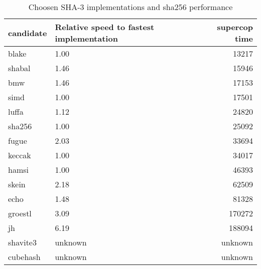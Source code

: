 \begin{table}
  \centering
  \begin{tabular}{ | l | l | r | }
    \hline
    \textbf{candidate} & \textbf{Relative speed to fastest implementation} & \textbf{supercop time} \\ \hline
     blake      & 1.00              & 13217         \\ \hline
     shabal     & 1.46              & 15946         \\ \hline
     bmw        & 1.46              & 17153         \\ \hline
     simd       & 1.00              & 17501         \\ \hline
     luffa      & 1.12              & 24820         \\ \hline
     sha256     & 1.00              & 25092         \\ \hline
     fugue      & 2.03              & 33694         \\ \hline
     keccak     & 1.00              & 34017         \\ \hline
     hamsi      & 1.00              & 46393         \\ \hline
     skein      & 2.18              & 62509         \\ \hline
     echo       & 1.48              & 81328         \\ \hline
     groestl    & 3.09              & 170272        \\ \hline
     jh         & 6.19              & 188094        \\ \hline
     shavite3   & unknown           & unknown       \\ \hline
     cubehash   & unknown           & unknown       \\ \hline
  \end{tabular}
  \caption{Choosen \ac{SHA}-3 implementations and sha256 performance}
  \label{tbl:sha3:speedrelative}
\end{table}
